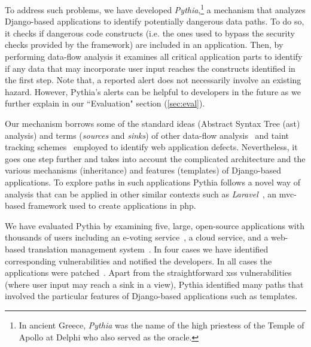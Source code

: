 To address such problems,
we have developed
{\it Pythia},\footnote{In
ancient Greece, {\it Pythia}
was the name of the high priestess
of the Temple of Apollo at Delphi
who also served as the oracle.}
a mechanism that analyzes
Django-based applications to identify
potentially dangerous data paths.
To do so,
it checks if dangerous code constructs
(i.e. the ones used to bypass the security checks provided by the framework)
are included in an application.
Then,
by performing data-flow analysis
it examines all critical application
parts to identify if any data that
may incorporate user input reaches
the constructs identified in the
first step.
Note that,
a reported alert does not necessarily involve
an existing hazard.
However,
Pythia's alerts can be helpful to
developers in the future as we
further explain in our ``Evaluation"
section (\ref{sec:eval}).

Our mechanism borrows some of
the standard ideas
(Abstract Syntax Tree ({\sc ast}) analysis)
and terms
({\it sources} and {\it sinks})
of other data-flow
analysis~\cite{LL05, JKK06, DH14}
and taint tracking
schemes~\cite{VFJKKV07, PMP11, SLMS14}
employed to identify
web application defects.
Nevertheless,
it goes one step further and takes
into account the complicated architecture
and the various mechanisms
(inheritance) and features (templates)
of Django-based applications.
To explore paths in such applications
Pythia follows a novel way of
analysis that can be applied
in other similar contexts such
as {\it Laravel}~\cite{laravel},
an {\sc mvc}-based framework used to
create applications in {\sc php}.

We have evaluated Pythia by
examining five,
large,
open-source applications
with thousands of users including
an e-voting service~\cite{zeus-jets},
a cloud service,
and a web-based translation
management system~\cite{weblate}.
In four cases we have identified
corresponding vulnerabilities and
notified the developers.
In all cases the applications
were patched~\cite{weblatepatch}.
Apart from the straightforward
{\sc xss} vulnerabilities
(where user input may reach a
sink in a view),
Pythia identified many paths
that involved the particular features of
Django-based applications such as templates.

\vspace{-1mm}
